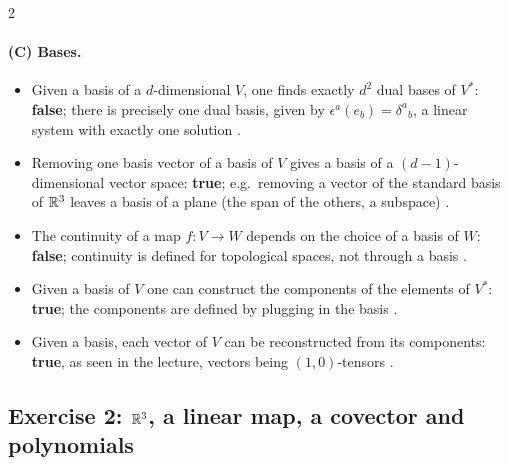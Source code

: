 \begin{paracol}{2}
\paragraph{(C) Bases.}
\begin{itemize}
  \item Given a basis of a $d$-dimensional $V$, one finds exactly $d^2$ dual bases of $V^*$: \textbf{false}; there is precisely one dual basis, given by $\epsilon^a(e_b)=\delta^a{}_b$, a linear system with exactly one solution .
  \item Removing one basis vector of a basis of $V$ gives a basis of a $(d-1)$-dimensional vector space: \textbf{true}; e.g.\ removing a vector of the standard basis of $\mathbb{R}^3$ leaves a basis of a plane (the span of the others, a subspace) .
  \item The continuity of a map $f\colon V\to W$ depends on the choice of a basis of $W$: \textbf{false}; continuity is defined for topological spaces, not through a basis .
  \item Given a basis of $V$ one can construct the components of the elements of $V^*$: \textbf{true}; the components are defined by plugging in the basis .
  \item Given a basis, each vector of $V$ can be reconstructed from its components: \textbf{true}, as seen in the lecture, vectors being $(1,0)$-tensors .
\end{itemize}

\subsection*{Exercise 2: $\mathbb{R}^3$, a linear map, a covector and polynomials}


\end{paracol}
